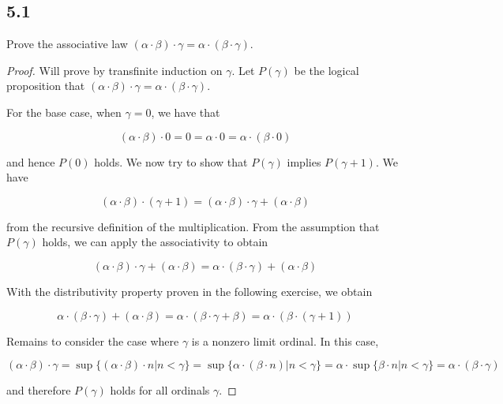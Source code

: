 \subsection*{5.1} Prove the associative law $(\alpha \cdot \beta) \cdot \gamma = \alpha \cdot (\beta \cdot \gamma)$.

\begin{proof}
    Will prove by transfinite induction on $\gamma$. Let $P(\gamma)$ be the logical proposition that $(\alpha \cdot \beta) \cdot \gamma = \alpha \cdot (\beta \cdot \gamma)$.
    
    For the base case, when $\gamma = 0$, we have that

    $$(\alpha \cdot \beta) \cdot 0 = 0 = \alpha \cdot 0 = \alpha \cdot (\beta \cdot 0) $$

    and hence $P(0)$ holds. We now try to show that $P(\gamma)$ implies $P(\gamma+1)$. We have

    $$(\alpha \cdot \beta) \cdot (\gamma + 1) = (\alpha \cdot \beta) \cdot \gamma + (\alpha \cdot \beta) $$

    from the recursive definition of the multiplication. From the assumption that $P(\gamma)$ holds, we can apply the associativity to obtain

    $$(\alpha \cdot \beta) \cdot \gamma + (\alpha \cdot \beta) =
    \alpha \cdot (\beta \cdot \gamma)  + (\alpha \cdot \beta)
    $$

    With the distributivity property proven in the following exercise, we obtain

    $$\alpha \cdot (\beta \cdot \gamma)  + (\alpha \cdot \beta) = \alpha \cdot (\beta \cdot \gamma + \beta) = \alpha \cdot (\beta \cdot (\gamma + 1))$$

    Remains to consider the case where $\gamma$ is a nonzero limit ordinal. In this case,

    $$(\alpha \cdot \beta) \cdot \gamma =
    \sup\{(\alpha \cdot \beta) \cdot n | n < \gamma\} = 
    \sup\{\alpha \cdot (\beta \cdot n) | n < \gamma\} = 
    \alpha \cdot \sup\{\beta \cdot n | n < \gamma\} = 
    \alpha \cdot (\beta \cdot \gamma)$$

    and therefore $P(\gamma)$ holds for all ordinals $\gamma$.
\end{proof}


